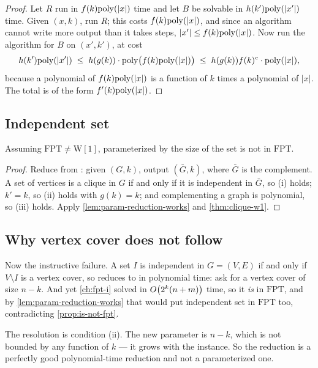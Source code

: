 \begin{proof}
Let $R$ run in $f(k)\mathrm{poly}(|x|)$ time and let $B$ be solvable in
$h(k')\mathrm{poly}(|x'|)$ time. Given $(x,k)$, run $R$; this costs
$f(k)\mathrm{poly}(|x|)$, and since an algorithm cannot write more output than it takes
steps, $|x'| \le f(k)\mathrm{poly}(|x|)$. Now run the algorithm for $B$ on $(x',k')$,
at cost
\[ h(k')\mathrm{poly}(|x'|) \;\le\; h(g(k)) \cdot \mathrm{poly}\bigl(f(k)\mathrm{poly}(|x|)\bigr)
   \;\le\; h(g(k)) f(k)^{c} \cdot \mathrm{poly}(|x|), \]
because a polynomial of $f(k)\mathrm{poly}(|x|)$ is a function of $k$ times a
polynomial of $|x|$. The total is of the form $f'(k)\mathrm{poly}(|x|)$.
\end{proof}

\subsection{Independent set}

\begin{proposition}\label{prop:is-not-fpt}
Assuming $\mathrm{FPT} \ne \mathrm{W}[1]$,  parameterized
by the size of the set is not in $\mathrm{FPT}$.
\end{proposition}

\begin{proof}
Reduce from : given $(G,k)$, output $(\bar G, k)$, where $\bar G$
is the complement. A set of vertices is a clique in $G$ if and only if it is
independent in $\bar G$, so (i) holds; $k' = k$, so (ii) holds with
$g(k) = k$; and complementing a graph is polynomial, so (iii) holds. Apply
\cref{lem:param-reduction-works} and \cref{thm:clique-w1}.
\end{proof}

\subsection{Why vertex cover does not follow}

Now the instructive failure. A set $I$ is independent in $G = (V,E)$ if and only
if $V \setminus I$ is a vertex cover, so  reduces to
 in polynomial time: ask for a vertex cover of size $n-k$.
And yet \cref{ch:fpt-i} solved  in $O\!\left(2^k(n+m)\right)$ time,
so it \emph{is} in $\mathrm{FPT}$, and by
\cref{lem:param-reduction-works} that would put independent set in
$\mathrm{FPT}$ too, contradicting \cref{prop:is-not-fpt}.

The resolution is condition (ii). The new parameter is $n-k$, which is not
bounded by any function of $k$ --- it grows with the instance. So the reduction
is a perfectly good polynomial-time reduction and not a parameterized one.

